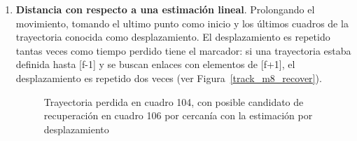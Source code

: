\begin{itemize}
\begin{enumerate}
  \item \textbf{Distancia con respecto a una estimación lineal}. Prolongando el movimiento, tomando el ultimo punto como inicio y los últimos cuadros de la trayectoria conocida como desplazamiento. El desplazamiento es repetido tantas veces como tiempo perdido tiene el marcador: si una trayectoria estaba definida hasta [f-1] y se buscan enlaces con elementos de [f+1], el desplazamiento es repetido dos veces (ver Figura~\ref{track_m8_recover}). 
 
\begin{figure}[H]
 \centering
  \hspace{3 mm}
	
\caption{Trayectoria perdida en cuadro 104, con posible candidato de recuperación en cuadro 106 por cercanía con la estimación por desplazamiento}
\label{inventario_trayectoria_direccional}
\end{figure} 
  

\end{enumerate}
\end{itemize}
